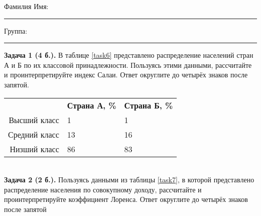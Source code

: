 \documentclass{article}
\begin{document}
\mbox{}

\vspace{-36pt}

\begin{center}
	\begin{tcolorbox}[colback=white, boxrule=0.20ex, sharp corners = all, height=25pt, colframe=black, valign=top]
		\begin{center}
			Фамилия Имя:\hspace{1.5pt}\rule{190pt}{0pt}\hspace{50pt}Группа:\hspace{1.5pt}\rule{60pt}{0pt}
		\end{center}
	\end{tcolorbox}
\end{center}
\vspace{3pt}

\textbf{Задача 1 (4 б.).} В таблице \ref{task6} представлено распределение населений стран А и Б по их классовой принадлежности. Пользуясь этими данными, рассчитайте и проинтерпретируйте индекс Салаи. Ответ округлите до четырёх знаков после запятой.\\

\begin{minipage}{\textwidth}
\centering
\begin{tabularx}{0.7\textwidth}{rYY}
\toprule
 & \textbf{Страна А, \%} & \textbf{Страна Б, \%} \\
\cmidrule(lr){2-2}\cmidrule(lr){3-3}
Высший класс & 1 & 1 \\

Средний класс & 13 & 16 \\

Низший класс & 86 & 83 \\
\bottomrule
\end{tabularx}
\label{task6}
\end{minipage} \\[35pt]

\textbf{Задача 2 (2 б.).} Пользуясь данными из таблицы \ref{task7}, в которой представлено распределение населения по совокупному доходу, рассчитайте и проинтерпретируйте коэффициент Лоренса. Ответ округлите до четырёх знаков после запятой\\
\end{document}

